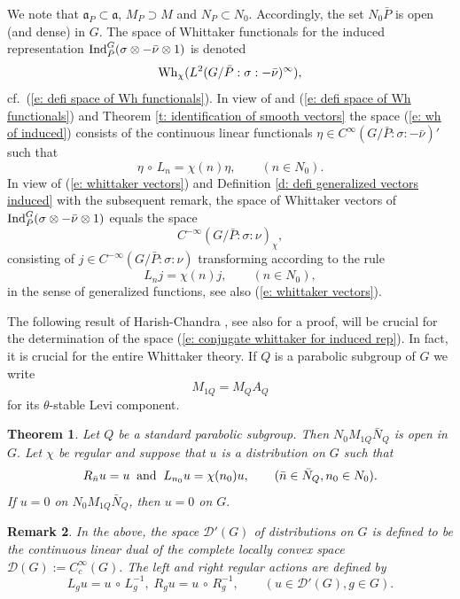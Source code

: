 \documentclass[12pt,a4paper]{article}
\newtheorem{Thm}{Theorem}
\newtheorem{Rem}[Thm]{Remark}
\newenvironment{thm}[0]{\begin{Thm}\noindent}%
{\end{Thm}}
\newenvironment{rem}[0]{\begin{Rem}\noindent\rm}%
{\end{Rem}}
\def\qquad{\quad\quad}
\def\gs{\sigma}
\def\got#1{\mathfrak #1}
\def\fa{{\got a}}
\def\after{\,{\scriptstyle\circ}\,}
\def\cD{{\mathcal D}}
\numberwithin{Thm}{section}
\numberwithin{equation}{section}
\def\Ind{{\rm Ind}}
\def\Wh{{\rm Wh}}
\numberwithin{equation}{section}
\def\cchi{\chi}
\begin{document}
We note that $\fa_P\subset \fa$, $M_P \supset M$ and $N_P \subset N_0.$ 
Accordingly, the set $N_0 \bar P$ is open (and dense) in $G.$ 
The space of Whittaker functionals for the induced representation 
$\Ind_{\bar P}^G (\gs \otimes - \bar \nu \otimes 1)$ is denoted 
\begin{equation}
\label{e: wh of induced}
\Wh_\cchi (L^2(G/ \bar P:\gs: -\bar \nu)^\infty),
\end{equation}
cf.\  (\ref{e: defi space of Wh functionals}). In view of
and (\ref{e: defi space of Wh functionals}) and Theorem \ref{t: identification of smooth vectors}
the space (\ref{e: wh of induced}) consists of the continuous linear 
functionals $\eta \in  C^\infty(G/\bar P:\gs: -\bar\nu)'$ 
such that
$$
\eta \after L_n = \cchi(n) \eta,\qquad (n \in N_0).
$$%
In view of (\ref{e: whittaker vectors}) and Definition \ref{d: defi generalized vectors induced} with the subsequent remark, 
the space of 
Whittaker vectors of  $\Ind_{\bar P}^G (\gs \otimes -\bar \nu \otimes 1)$ equals 
the space 
\begin{equation}
\label{e: conjugate whittaker for induced rep} 
C^{-\infty}(G/\bar P: \gs: \nu)_\cchi,
\end{equation}
consisting of $j \in  C^{-\infty}(G/\bar P: \gs: \nu)$ transforming according to the rule
$$ 
L_n j  = \cchi(n) j ,\qquad (n \in N_0),
$$%
in the sense of generalized functions,
see also (\ref{e: whittaker vectors}).

The following result of Harish-Chandra \cite[Thm.~1, p.~143]{HCwhit}, see also \cite{KVwhit} for a proof,
will be crucial for the determination of the space (\ref{e: conjugate whittaker for induced rep}). In fact, it is 
crucial for the entire Whittaker theory.  
If $Q$ is a parabolic subgroup of $G$ we write 
$$ 
M_{1Q} = M_Q A_Q
$$%
for its $\theta$-stable Levi component.

\begin{thm}{\rm (Harish-Chandra \cite{HCwhit})\ }
\label{t: main thm HC}
Let $Q$ be a standard parabolic subgroup. Then $N_0 M_{1Q} \bar N_Q$ is open 
in $G.$ Let $\cchi$ be regular and suppose that $u$ is a distribution on $G$ such that 
$$ 
R_{\bar n} u = u \;\;\mbox {\rm and}\;\; L_{n_0}u = \cchi(n_0) u,\qquad (\bar n \in \bar N_Q, n_0 \in N_0).
$$%
If $u = 0$ on $N_0 M_{1Q} \bar N_Q$, then $u = 0$ on $G.$ 
\end{thm}
%
\begin{rem} 
In the above, the space $\cD'(G)$ of distributions on $G$ is 
defined to be the continuous linear dual of the complete locally convex space $\cD(G):= C_c^\infty(G).$ The left and right regular actions are defined by 
$$ 
L_g u = u \after L_g^{-1},\; R_g u = u \after R_g^{-1}, \qquad (u \in \cD'(G), g \in G).
$$ 
\end{rem}
%
\end{document}
